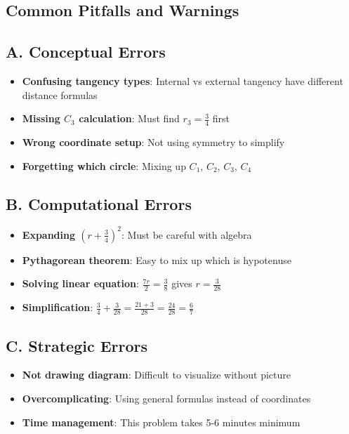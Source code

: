 \documentclass[11pt]{article}
\begin{document}
\begin{pitfallbox}
\section*{Common Pitfalls and Warnings}

\subsection*{A. Conceptual Errors}
\begin{itemize}[leftmargin=*]
    \item \textbf{Confusing tangency types}: Internal vs external tangency have different distance formulas
    \item \textbf{Missing $C_3$ calculation}: Must find $r_3 = \frac{3}{4}$ first
    \item \textbf{Wrong coordinate setup}: Not using symmetry to simplify
    \item \textbf{Forgetting which circle}: Mixing up $C_1$, $C_2$, $C_3$, $C_4$
\end{itemize}

\subsection*{B. Computational Errors}
\begin{itemize}[leftmargin=*]
    \item \textbf{Expanding $(r + \frac{3}{4})^2$}: Must be careful with algebra
    \item \textbf{Pythagorean theorem}: Easy to mix up which is hypotenuse
    \item \textbf{Solving linear equation}: $\frac{7r}{2} = \frac{3}{8}$ gives $r = \frac{3}{28}$
    \item \textbf{Simplification}: $\frac{3}{4} + \frac{3}{28} = \frac{21+3}{28} = \frac{24}{28} = \frac{6}{7}$
\end{itemize}

\subsection*{C. Strategic Errors}
\begin{itemize}[leftmargin=*]
    \item \textbf{Not drawing diagram}: Difficult to visualize without picture
    \item \textbf{Overcomplicating}: Using general formulas instead of coordinates
    \item \textbf{Time management}: This problem takes 5-6 minutes minimum
\end{itemize}


\end{pitfallbox}
\end{document}
